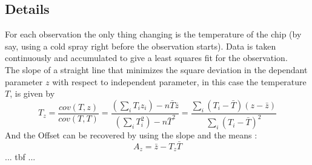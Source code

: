 \documentclass{article}
\begin{document}
\subsection{Details}
For each observation the only thing changing is the temperature of
the chip (by say, using a cold spray right before the observation
starts). Data is taken continuously and accumulated to give a least
squares fit for the observation.
\\
The slope of a straight line that minimizes the square deviation
in the dependant parameter $z$ with respect to independent parameter, in this case the temperature $T$, is given by
\begin{equation}
T_z = \frac{ cov(T,z) } { cov(T,T) } = 
\frac{ (\sum_i T_i z_i) - n \bar{T}\bar{z} } { (\sum_i T_i^2) - n \bar{T}^2 } = 
\frac{ \sum_i (T_i - \bar{T})(z - \bar{z}) } { \sum_i ( T_i - \bar{T} )^2 }
\end{equation}
And the Offset can be recovered by using the slope and the means :
\begin{equation}
A_z = \bar{z} - T_z \bar{T}
\end{equation}
... tbf ...\\
\end{document}
